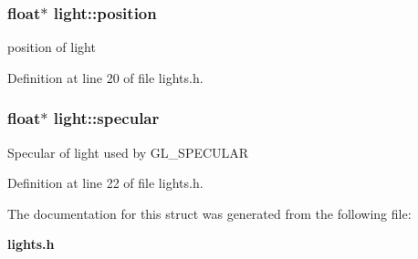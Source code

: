 \subsubsection{\setlength{\rightskip}{0pt plus 5cm}float$\ast$ {\bf light::position}}\label{structlight_o1}


position of light 

Definition at line 20 of file lights.h.
\subsubsection{\setlength{\rightskip}{0pt plus 5cm}float$\ast$ {\bf light::specular}}\label{structlight_o3}


Specular of light used by GL\_\-SPECULAR 

Definition at line 22 of file lights.h.

The documentation for this struct was generated from the following file:\begin{CompactItemize}
\item 
{\bf lights.h}\end{CompactItemize}

